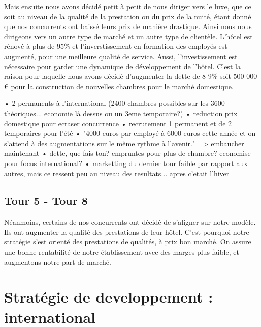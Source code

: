 \documentclass[a4paper,10pt]{article}
\begin{document}
      Mais ensuite nous avons décidé petit à petit de nous diriger vers le luxe,
      que ce soit au niveau de la qualité de la prestation ou du prix de la nuité,
      étant donné que nos concurrents ont baissé leurs prix de manière drastique.
      \newline
      \newline
      Ainsi nous nous dirigeons vers un autre type de marché et un autre type de clientèle.
      L’hôtel est rénové à plus de 95\% et l'inverstissement en formation des employés est augmenté, pour une meilleure qualité de service.
      \newline
      \newline
      Aussi,  l’investissement est nécessaire pour garder une dynamique de développement de l’hôtel.
      C’est la raison pour laquelle nous avons décidé d’augmenter la dette de 8-9\%
      soit 500 000 € pour la construction de nouvelles chambres pour le marché domestique.
      
      
      • 2 permanents à l'international (2400 chambres possibles sur les 3600 théoriques... economie là dessus ou un 3eme temporaire?)
      • reduction prix domestique pour ecraser concurrence
      • recrutement 1 permanent et de 2 temporaires pour l'été
      • "4000 euros par employé à 6000 euros cette année et on s'attend à des augmentations sur le même rythme à l'avenir." => embaucher maintenant
      • dette, que fais ton? empruntes pour plus de chambre? economise pour focus international?
      • marketting du dernier tour faible par rapport aux autres, mais ce ressent peu au niveau des resultats... apres c'etait l'hiver



    \subsection{Tour 5 - Tour 8}
      Néanmoins, certains de nos concurrents ont décidé de s’aligner sur notre modèle.
      Ils ont augmenter la qualité des prestations de leur hôtel.
      C’est pourquoi notre stratégie s’est orienté des prestations de qualités, à prix bon marché.
      On assure une bonne rentabilité de notre établissement avec des marges plus faible, et augmentons notre part de marché.

      
   \newpage
   \section{Stratégie de developpement : international}
    
\end{document}

